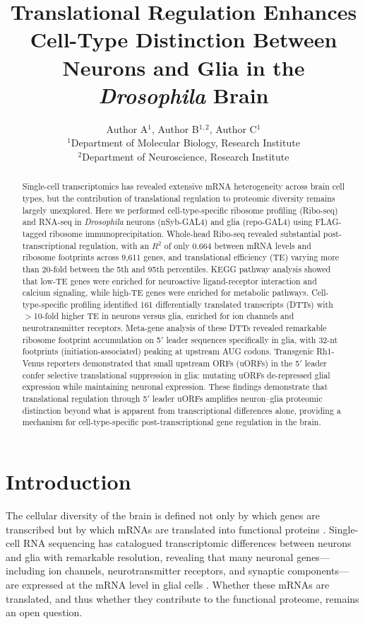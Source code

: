 \documentclass[11pt]{article}
\title{Translational Regulation Enhances Cell-Type Distinction Between Neurons and Glia in the \textit{Drosophila} Brain}
\author{Author A$^{1}$, Author B$^{1,2}$, Author C$^{1}$ \\
\small $^{1}$Department of Molecular Biology, Research Institute \\
\small $^{2}$Department of Neuroscience, Research Institute}
\date{}
\begin{document}
\maketitle

\begin{abstract}
Single-cell transcriptomics has revealed extensive mRNA heterogeneity across brain cell types, but the contribution of translational regulation to proteomic diversity remains largely unexplored. Here we performed cell-type-specific ribosome profiling (Ribo-seq) and RNA-seq in \textit{Drosophila} neurons (nSyb-GAL4) and glia (repo-GAL4) using FLAG-tagged ribosome immunoprecipitation. Whole-head Ribo-seq revealed substantial post-transcriptional regulation, with an $R^2$ of only 0.664 between mRNA levels and ribosome footprints across 9,611 genes, and translational efficiency (TE) varying more than 20-fold between the 5th and 95th percentiles. KEGG pathway analysis showed that low-TE genes were enriched for neuroactive ligand-receptor interaction and calcium signaling, while high-TE genes were enriched for metabolic pathways. Cell-type-specific profiling identified 161 differentially translated transcripts (DTTs) with $>$10-fold higher TE in neurons versus glia, enriched for ion channels and neurotransmitter receptors. Meta-gene analysis of these DTTs revealed remarkable ribosome footprint accumulation on 5$'$ leader sequences specifically in glia, with 32-nt footprints (initiation-associated) peaking at upstream AUG codons. Transgenic Rh1-Venus reporters demonstrated that small upstream ORFs (uORFs) in the 5$'$ leader confer selective translational suppression in glia: mutating uORFs de-repressed glial expression while maintaining neuronal expression. These findings demonstrate that translational regulation through 5$'$ leader uORFs amplifies neuron--glia proteomic distinction beyond what is apparent from transcriptional differences alone, providing a mechanism for cell-type-specific post-transcriptional gene regulation in the brain.
\end{abstract}

\section{Introduction}

The cellular diversity of the brain is defined not only by which genes are transcribed but by which mRNAs are translated into functional proteins \citep{trapnell2015single, zeisel2015brain}. Single-cell RNA sequencing has catalogued transcriptomic differences between neurons and glia with remarkable resolution, revealing that many neuronal genes---including ion channels, neurotransmitter receptors, and synaptic components---are expressed at the mRNA level in glial cells \citep{drosophila_brain2019}. Whether these mRNAs are translated, and thus whether they contribute to the functional proteome, remains an open question.
\end{document}
